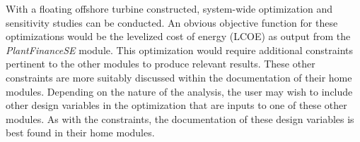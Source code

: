 With a floating offshore turbine constructed, system-wide optimization
and sensitivity studies can be conducted.  An obvious objective function
for these optimizations would be the levelized cost of energy (LCOE) as
output from the \textit{PlantFinanceSE} module.  This optimization would
require additional constraints pertinent to the other modules to produce
relevant results.  These other constraints are more suitably discussed
within the documentation of their home modules.  Depending on the nature
of the analysis, the user may wish to include other design variables in
the optimization that are inputs to one of these other modules.  As with
the constraints, the documentation of these design variables is best
found in their home modules.

